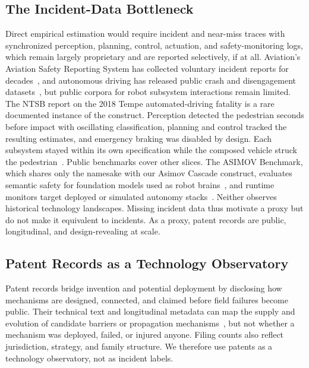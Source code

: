 \documentclass[letterpaper,9pt,conference]{ieeeconf}
\begin{document}
\subsection{The Incident-Data Bottleneck}

Direct empirical estimation would require incident and near-miss traces with synchronized perception, planning, control, actuation, and safety-monitoring logs, which remain largely proprietary and are reported selectively, if at all. Aviation's Aviation Safety Reporting System has collected voluntary incident reports for decades~\cite{corrie1997}, and autonomous driving has released public crash and disengagement datasets~\cite{sinha2021}, but public corpora for robot subsystem interactions remain limited. The NTSB report on the 2018 Tempe automated-driving fatality is a rare documented instance of the construct. Perception detected the pedestrian seconds before impact with oscillating classification, planning and control tracked the resulting estimates, and emergency braking was disabled by design. Each subsystem stayed within its own specification while the composed vehicle struck the pedestrian~\cite{ntsb2019}. Public benchmarks cover other slices. The ASIMOV Benchmark, which shares only the namesake with our Asimov Cascade construct, evaluates semantic safety for foundation models used as robot brains~\cite{sermanet2025}, and runtime monitors target deployed or simulated autonomy stacks~\cite{gupta2024,chakraborty2025}. Neither observes historical technology landscapes. Missing incident data thus motivate a proxy but do not make it equivalent to incidents. As a proxy, patent records are public, longitudinal, and design-revealing at scale.

\subsection{Patent Records as a Technology Observatory}

Patent records bridge invention and potential deployment by disclosing how mechanisms are designed, connected, and claimed before field failures become public. Their technical text and longitudinal metadata can map the supply and evolution of candidate barriers or propagation mechanisms~\cite{gao2013,lee2016,altuntas2015,arts2021}, but not whether a mechanism was deployed, failed, or injured anyone. Filing counts also reflect jurisdiction, strategy, and family structure. We therefore use patents as a technology observatory, not as incident labels.
\end{document}

